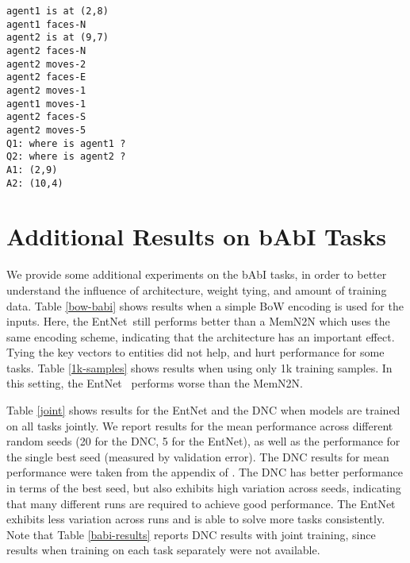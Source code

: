 \documentclass{article} \usepackage{iclr2016_conference,times}
\newcommand{\modelabbrev}{EntNet}
\begin{document}
\texttt{agent1 is at (2,8) \\
 agent1 faces-N \\
 agent2 is at (9,7) \\
 agent2 faces-N \\
 agent2 moves-2 \\
 agent2 faces-E \\
 agent2 moves-1 \\
 agent1 moves-1  \\
 agent2 faces-S   \\
 agent2 moves-5   \\
 Q1: where is agent1 ? \\
 Q2: where is agent2 ? \\
 A1: (2,9) \\
 A2: (10,4) \\
}


\section{Additional Results on bAbI Tasks}\label{sec:app_babi}

We provide some additional experiments on the bAbI tasks, in order to better understand the influence of architecture, weight tying, and amount of training data. Table \ref{bow-babi} shows results when a simple BoW encoding is used for the inputs. Here, the \modelabbrev~still performs better than a MemN2N which uses the same encoding scheme, indicating that the architecture has an important effect.
Tying the key vectors to entities did not help, and hurt performance for some tasks. Table \ref{1k-samples} shows results when using only 1k training samples. In this setting, the \modelabbrev~ performs worse than the MemN2N.

Table \ref{joint} shows results for the EntNet and the DNC when models are trained on all tasks jointly. 
We report results for the mean performance across different random seeds (20 for the DNC, 5 for the EntNet), as well as the performance for the single best seed (measured by validation error).
The DNC results for mean performance were taken from the appendix of \cite{graves2016hybrid}.
The DNC has better performance in terms of the best seed, but also exhibits high variation across seeds, indicating that many different runs are required to achieve good performance.
The EntNet exhibits less variation across runs and is able to solve more tasks consistently.
Note that Table \ref{babi-results} reports DNC results with joint training, since results when training on each task separately were not available.
\end{document}
